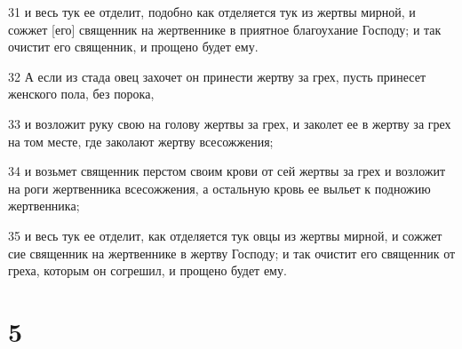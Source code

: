 \par 31 и весь тук ее отделит, подобно как отделяется тук из жертвы мирной, и сожжет [его] священник на жертвеннике в приятное благоухание Господу; и так очистит его священник, и прощено будет ему.
\par 32 А если из стада овец захочет он принести жертву за грех, пусть принесет женского пола, без порока,
\par 33 и возложит руку свою на голову жертвы за грех, и заколет ее в жертву за грех на том месте, где заколают жертву всесожжения;
\par 34 и возьмет священник перстом своим крови от сей жертвы за грех и возложит на роги жертвенника всесожжения, а остальную кровь ее выльет к подножию жертвенника;
\par 35 и весь тук ее отделит, как отделяется тук овцы из жертвы мирной, и сожжет сие священник на жертвеннике в жертву Господу; и так очистит его священник от греха, которым он согрешил, и прощено будет ему.

\chapter{5}

